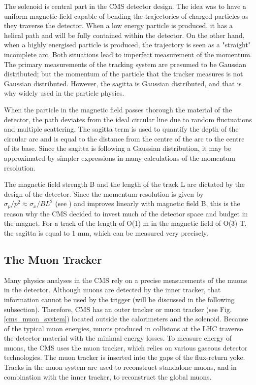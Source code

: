 \begin{normalsize}
The solenoid is central part in the CMS detector design. The idea was to have a uniform magnetic field capable of bending the trajectories of charged particles as they traverse the detector. When a low energy particle is produced, it has a helical path and will be fully contained within the detector. On the other hand, when a highly energised particle is produced, the trajectory is seen as a "straight" incomplete arc. Both situations lead to imperfect measurement of the momentum. The primary measurements of the tracking system are presumed to be Gaussian distributed; but the momentum of the particle that the tracker measures is not Gaussian distributed. However, the sagitta is Gaussian distributed, and that is why widely used in the particle physics. 

When the particle in the magnetic field passes thorough the material of the detector, the path deviates from the ideal circular line due to random fluctuations and multiple scattering. The sagitta term is used to quantify the depth of the circular arc and is equal to the distance from the centre of the arc to the centre of its base. Since the sagitta is following a Gaussian distribution, it may be approximated by simpler expressions in many calculations of the momentum resolution. 

The magnetic field strength B and the length of the track L are dictated by the design of the detector. Since the momentum resolution is given by $\sigma_p / p^2 \approx \sigma_x / B L^2 $ (see \cite {Hauptman:2011zza}) and improves linearly with magnetic field B, this is the reason why the CMS decided to invest much of the detector space and budget in the magnet. For a track of the length of O(1) m in the magnetic field of O(3) T, the sagitta is equal to 1 mm, which can be measured very precisely. 



\subsection{The Muon Tracker}

Many physics analyses in the CMS rely on a precise measurements of the muons in the detector. Although muons are detected by the inner tracker, that information cannot be used by the trigger (will be discussed in the following subsection). Therefore, CMS has an outer tracker or muon tracker \cite{Muon_system_TDR} (see Fig. \ref{cms_muon_system}) located outside the calorimeters and the solenoid. Because of the typical muon energies, muons produced in collisions at the LHC traverse the detector material with the minimal energy losses. To measure energy of muons, the CMS uses the muon tracker, which relies on various gaseous detector technologies. The muon tracker is inserted into the gaps of the flux-return yoke. Tracks in the muon system are used to reconstruct standalone muons, and in combination with the inner tracker, to reconstruct the global muons.


\end{normalsize}
